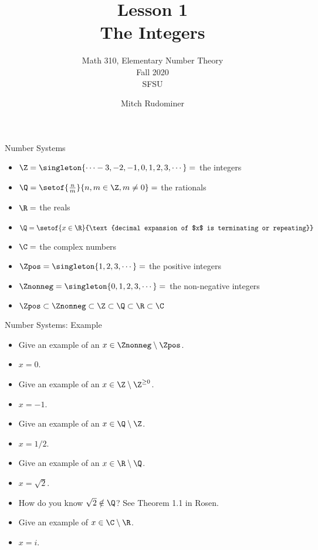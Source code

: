 \documentclass{beamer}
\title{Lesson 1 \\ The Integers}
\subtitle{Math 310, Elementary Number Theory \\ Fall 2020 \\ SFSU}
\author{Mitch Rudominer}
\date{}
\begin{document}
\begin{frame}
  \titlepage
\end{frame}


\begin{frame}{Number Systems}

  \begin{itemize}
  \item $\Z = \singleton{\cdots -3,-2,-1,0,1,2,3,\cdots} = $ the integers
  \item $\Q = \setof{\frac{n}{m}}{n,m\in \Z, m\not= 0} = $ the rationals
  \item $\R = $ the reals
  \item $\Q = \setof{x\in\R}{\text{decimal expansion of $x$ is terminating or repeating}}$
  \item $\C = $ the complex numbers
  \item $\Zpos = \singleton{1,2,3,\cdots} =$ the positive integers
  \item $\Znonneg = \singleton{0,1,2,3,\cdots} =$ the non-negative integers
  \item  $\Zpos \subset \Znonneg \subset \Z \subset \Q \subset \R \subset \C$
  \end{itemize}


\end{frame}

\begin{frame}{Number Systems: Example}
\begin{itemize}
  \item  Give an example of an $x\in \Znonneg \setminus \Zpos$.
  \item $x=0$.
  \item  Give an example of an $x\in \Z \setminus \Z^{\geq 0}$.
  \item $x=-1$.
  \item  Give an example of an $x\in \Q \setminus \Z$.
  \item $x=1/2$.
  \item  Give an example of an $x\in \R \setminus \Q$.
  \item $x=\sqrt{2}$.
  \item How do you know $\sqrt{2}\notin \Q$? See Theorem 1.1 in Rosen.
  \item Give an example of $x\in\C \setminus \R$.
  \item $x=i$.
  \end{itemize}
\end{frame}
\end{document}
